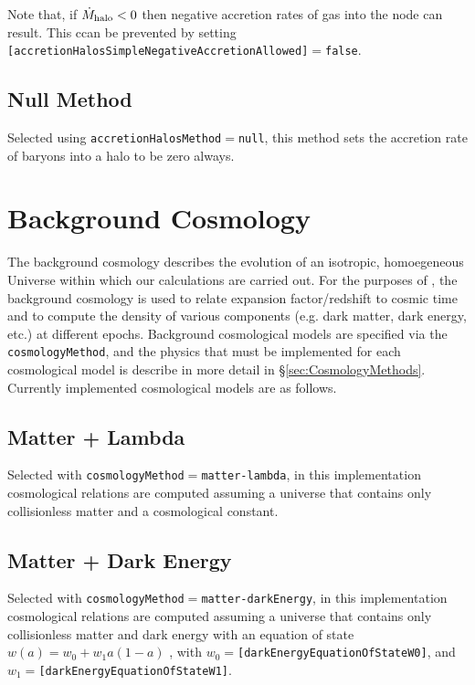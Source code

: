 Note that, if $\dot{M}_{\rm halo} < 0$ then negative accretion rates of gas into the node can result. This ccan be prevented by setting {\tt [accretionHalosSimpleNegativeAccretionAllowed]}$=${\tt false}.

\subsection{Null Method}

Selected using {\tt accretionHalosMethod}$=${\tt null}, this method sets the accretion rate of baryons into a halo to be zero always.

\section{Background Cosmology}

The background cosmology describes the evolution of an isotropic, homoegeneous Universe within which our calculations are carried out. For the purposes of \glc, the background cosmology is used to relate expansion factor/redshift to cosmic time and to compute the density of various components (e.g. dark matter, dark energy, etc.) at different epochs. Background cosmological models are specified via the {\tt cosmologyMethod}, and the physics that must be implemented for each cosmological model is describe in more detail in \S\ref{sec:CosmologyMethods}. Currently implemented cosmological models are as follows.

\subsection{Matter + Lambda}

Selected with {\tt cosmologyMethod}$=${\tt matter-lambda}, in this implementation cosmological relations are computed assuming a universe that contains only collisionless matter and a cosmological constant.

\subsection{Matter + Dark Energy}

Selected with {\tt cosmologyMethod}$=${\tt matter-darkEnergy}, in this implementation cosmological relations are computed assuming a universe that contains only collisionless matter and dark energy with an equation of state $w(a)=w_0+w_1a(1-a)$ \citep{jassal_wmap_2005}, with $w_0=${\tt [darkEnergyEquationOfStateW0]}, and $w_1=${\tt [darkEnergyEquationOfStateW1]}.

